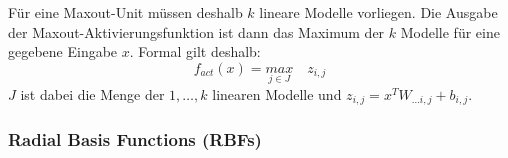 Für eine Maxout-Unit müssen deshalb $k$ lineare Modelle vorliegen. Die Ausgabe der Maxout-Aktivierungsfunktion ist dann das Maximum der $k$ Modelle für eine gegebene Eingabe $x$. Formal gilt deshalb:
\[
	f_{act}(x) = \underset{j \in J}{max} \quad z_{i,j}
\]
$J$ ist dabei die Menge der $1, \ldots, k$ linearen Modelle und $z_{i,j} = x^T W_{\ldots i,j} + b_{i,j}$.

\subsubsection*{Radial Basis Functions (RBFs)}

